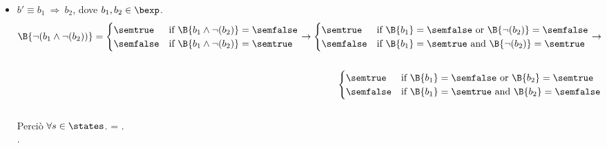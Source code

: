 {\begin{enumerate}[label=(\alph*)]
\begin{itemize}
\begin{align*}
      \begin{cases}
      \semtrue &
      \mbox{if} \ \A{a_1} \not \leq \A{a_2}
                  \mbox{ or }
                  \A{a_1} = \A{a_2} \\
      \semfalse &
      \mbox{if} \ \A{a_1} \leq \A{a_2}
                  \mbox{ and }
                  \A{a_1} \neq \A{a_2} \\
      \end{cases}
      \rightarrow \\ \\
      \begin{cases}
      \semtrue &
      \mbox{if} \ \A{a_1} \geq \A{a_2} \\
      \semfalse &
      \mbox{if} \ \A{a_1} < \A{a_2} \\
      \end{cases}
    \end{align*} \\
      Perciò $\forall s \in \states$. =
      . \\.

    \item $ b' \equiv b_1 \ \Rightarrow \ b_2$, dove $b_1, b_2 \in \bexp$. \\
    \begin{align*}
      \B{\lnot(b_1 \land \lnot(b_2))} =
      \begin{cases}
      \semtrue &
      \mbox{if} \ \B{b_1 \land \lnot(b_2)} = \semfalse \\
      \semfalse &
      \mbox{if} \ \B{b_1 \land \lnot(b_2)} = \semtrue \\
      \end{cases}
      \rightarrow
      \begin{cases}
      \semtrue &
      \mbox{if} \ \B{b_1} = \semfalse
                  \mbox{ or }
                  \B{\lnot(b_2)} = \semfalse \\
      \semfalse &
      \mbox{if} \ \B{b_1} = \semtrue
                  \mbox{ and }
                  \B{\lnot(b_2)} = \semtrue \\
      \end{cases}
      \rightarrow \\ \\
      \begin{cases}
      \semtrue &
      \mbox{if} \ \B{b_1} = \semfalse
                  \mbox{ or }
                  \B{b_2} = \semtrue \\
      \semfalse &
      \mbox{if} \ \B{b_1} = \semtrue
                  \mbox{ and }
                  \B{b_2} = \semfalse \\
      \end{cases}
    \end{align*} \\
      Perciò $\forall s \in \states$. =
      . \\.


\end{itemize}
\end{enumerate}}
